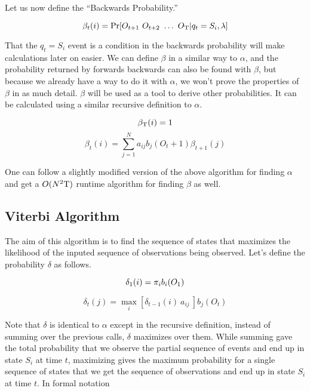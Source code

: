 Let us now define the ``Backwards Probability.''

\begin{equation}
  \beta_t(i) = \Pr[O_{t+1}\ O_{t+2}\ \ldots\ O_\Tau \vert q_t = S_i,
  \lambda]
\end{equation}

That the $q_t = S_i$ event is a condition in the backwards probability
will make calculations later on easier. We can define $\beta$ in a
similar way to $\alpha$, and the probability returned by forwards
backwards can also be found with $\beta$, but because we already have a way
to do it with $\alpha$, we won't prove the properties of $\beta$ in as
much detail. $\beta$ will be used as a tool to derive other probabilities.
It can be calculated using a similar recursive definition to $\alpha$.

\begin{equation}
  \beta_{\mathrm{T}}(i) = 1\\
\end{equation}
\begin{equation}
  \beta_t(i) = \sum_{j=1}^N a_{ij} b_j(O_t+1) \beta_{t+1}(j)
\end{equation}

One can follow a slightly modified version of the above algorithm for
finding $\alpha$ and get a $O(N^2\mathrm{T})$ runtime algorithm for finding
$\beta$ as well.

\subsection{Viterbi Algorithm}

The aim of this algorithm is to find the sequence of states that
maximizes the likelihood of the inputed sequence of observations being
observed. Let's define the probability $\delta$ as follows.

\begin{equation}
  \delta_1(i) = \pi_i b_i(O_1)\\
\end{equation}

\begin{equation}
  \delta_t(j) = \max_i[\delta_{t-1}(i)\ a_{ij}\ ] b_j(O_t)
\end{equation}

Note that $\delta$ is identical to $\alpha$ except in the recursive
definition, instead of summing over the previous calls, $\delta$ maximizes
over them. While summing gave the total probability that we observe the
partial sequence of events and end up in state $S_i$ at time $t$,
maximizing gives the maximum probability for a single sequence of
states that we get the sequence of observations and end up in state
$S_i$ at time $t$. In formal notation

